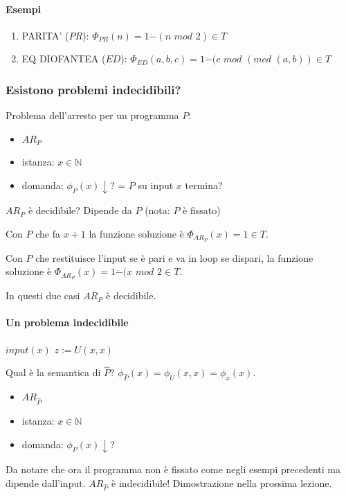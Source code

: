 \documentclass{article}
\begin{document}
\paragraph{Esempi}
\begin{enumerate}
	\item PARITA' ($PR$): $\Phi_{PR}(n) = 1 \dot{-} (n \textit{ mod }2) \in T$
	\item EQ DIOFANTEA ($ED$): $\Phi_{ED}(a,b,c) = 1 \dot{-} (c \textit{ mod }(\textit{mcd }(a,b)) \in T$
\end{enumerate}

\subsubsection{Esistono problemi indecidibili?}
Problema dell'arresto per un programma $P$:
\begin{itemize}
	\item $AR_P$
	\item istanza: $x \in \mathbb{N}$
	\item domanda: $\phi_P(x)\downarrow$? = $P$ su input $x$ termina?
\end{itemize}
$AR_P$ è decidibile? Dipende da $P$ (nota: $P$ è fissato)







Con $P$ che fa $x+1$ la funzione soluzione è $\Phi_{AR_P}(x)=1 \in T$.




Con $P$ che restituisce l'input se è pari e va in loop se dispari, la funzione soluzione è $\Phi_{AR_P}(x)=1 \dot{-} (x$ $mod$ $2 \in T$.




In questi due casi $AR_P$ è decidibile.
\paragraph{Un problema indecidibile}
\begin{algorithm}[!h]
	\caption{$\hat{P} \equiv$}
        \begin{algorithmic}[1]
        		 \State $input(x)$
        		 \State $z:=U(x,x)$ 
        \end{algorithmic}
    \end{algorithm}
    
Qual è la semantica di $\hat{P}$? $\phi_{\hat{P}}(x)=\phi_U(x,x)=\phi_x(x)$.
\begin{itemize}
	\item $AR_{\hat{P}}$
	\item istanza: $x \in \mathbb{N}$
	\item domanda: $\phi_P(x)\downarrow$? 
\end{itemize}
Da notare che ora il programma non è fissato come negli esempi precedenti ma dipende dall'input. $AR_{\hat{P}}$ è indecidibile! Dimostrazione nella prossima lezione.
\end{document}

